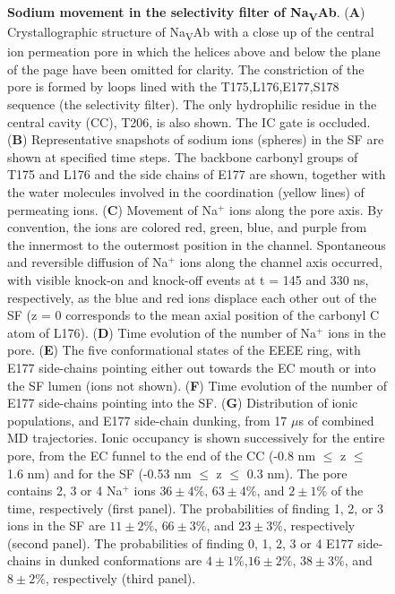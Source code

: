 \begin{refsection}
\begin{figure}[!ptb]
\caption[Sodium movement in the selectivity filter of Na\textsubscript{V}Ab]{\textbf{Sodium movement in the selectivity filter of Na\textsubscript{V}Ab}. (\textbf{A}) Crystallographic structure of Na\textsubscript{V}Ab with a close up of the central ion permeation pore in which the helices above and below the plane of the page have been omitted for clarity.  The constriction of the pore is formed by loops lined with the T175,L176,E177,S178 sequence (the selectivity filter).  The only hydrophilic residue in the central cavity (CC), T206, is also shown.  The IC gate is occluded. (\textbf{B}) Representative snapshots of sodium ions (spheres) in the SF are shown at specified time steps.  The backbone carbonyl groups of T175 and L176 and the side chains of E177 are shown, together with the water molecules involved in the coordination (yellow lines) of permeating ions. (\textbf{C}) Movement of Na$^+$ ions along the pore axis.  By convention, the ions are colored red, green, blue, and purple from the innermost to the outermost position in the channel.  Spontaneous and reversible diffusion of Na$^+$ ions along the channel axis occurred, with visible knock-on and knock-off events at t = 145 and 330 ns, respectively, as the blue and red ions displace each other out of the SF (z = 0 corresponds to the mean axial position of the carbonyl C atom of L176). (\textbf{D}) Time evolution of the number of Na$^+$ ions in the pore. (\textbf{E}) The five conformational states of the EEEE ring, with E177 side-chains pointing either out towards the EC mouth or into the SF lumen (ions not shown). (\textbf{F}) Time evolution of the number of E177 side-chains pointing into the SF. (\textbf{G}) Distribution of ionic populations, and E177 side-chain dunking, from 17 $\mu$s of combined MD trajectories.  Ionic occupancy is shown successively for the entire pore, from the EC funnel to the end of the CC (-0.8 nm $\leq$ z $\leq$ 1.6 nm) and for the SF (-0.53 nm $\leq$ z $\leq$ 0.3 nm).  The pore contains 2, 3 or 4 Na$^+$ ions $36\pm4\%$, $63\pm4\%$, and $2\pm1\%$ of the time, respectively (first panel).  The probabilities of finding 1, 2, or 3 ions in the SF are $11\pm2\%$, $66\pm3\%$, and $23\pm3\%$, respectively (second panel). The probabilities of finding 0, 1, 2, 3 or 4 E177 side-chains in dunked conformations are $4\pm1\%$,$16\pm2\%$, $38\pm3\%$, and $8\pm2\%$, respectively (third panel).}
\label{fig:nav1fig1}
\end{figure}


\end{refsection}

